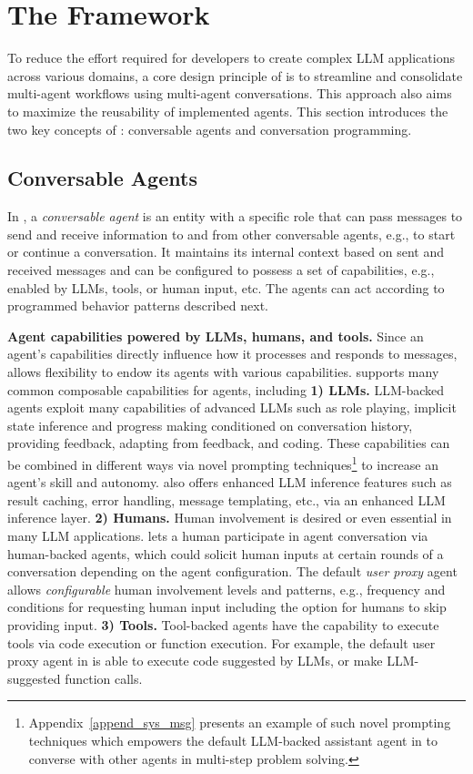 \section{The \libName Framework}\label{sec:framework}
To reduce the effort required for developers to create complex LLM applications across various domains, a core design principle of \libName is to streamline and consolidate multi-agent workflows using multi-agent conversations. This approach also aims to maximize the reusability of implemented agents.
This section introduces the two key concepts of \libName: conversable agents and conversation programming.

\subsection{Conversable Agents}\label{sec:agent}

In \libName, a \emph{conversable agent} is an entity with a specific role that  can pass messages to send and receive information to and from other conversable agents, e.g., to start or continue a conversation. It maintains its internal context 
based on sent and received messages and can be configured to possess a set of capabilities, e.g., enabled by LLMs, tools, or human input, etc. The agents can act according to programmed behavior patterns described next.
 
\textbf{Agent capabilities powered by LLMs, humans, and tools.}
Since an agent's capabilities directly influence how it processes and responds to messages, \libName allows flexibility to endow its agents with various capabilities. \libName supports many common composable capabilities for agents, including
\textbf{1) LLMs.}  LLM-backed agents 
exploit many capabilities of advanced LLMs such as role playing, implicit state inference and progress making conditioned on conversation history, providing feedback, adapting from feedback, and coding. These capabilities can be combined in different ways via novel prompting techniques\footnote{Appendix~\ref{append_sys_msg} presents an example of such novel prompting techniques which empowers the default LLM-backed assistant agent in \libName to converse with other agents in multi-step problem solving.} to increase an agent's skill and autonomy. \libName also offers enhanced LLM inference features
such as result caching, error handling, message templating, etc., via an enhanced LLM inference layer. 
\textbf{2) Humans.} Human involvement is desired or even essential in many LLM applications. \libName lets a human participate in agent conversation via human-backed agents, which could solicit human inputs at certain rounds of a conversation depending on the agent configuration. The default \emph{user proxy} agent allows {\em configurable} human involvement levels and patterns, e.g., frequency and conditions for requesting human input including the option for humans to skip providing input. 
\textbf{3) Tools.} Tool-backed agents have the capability to execute tools via code execution or function execution.
For example, the default user proxy agent in \libName is able to execute code suggested by LLMs, or make LLM-suggested function calls. 

